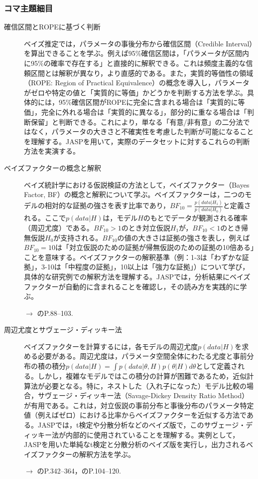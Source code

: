 \subsubsection{コマ主題細目}
\begin{description}
	\item[確信区間とROPEに基づく判断] ベイズ推定では，パラメータの事後分布から確信区間（Credible Interval）を算出できることを学ぶ。例えば95\%確信区間は，「パラメータが区間内に95\%の確率で存在する」と直接的に解釈できる。これは頻度主義的な信頼区間とは解釈が異なり，より直感的である。また，実質的等価性の領域（ROPE: Region of Practical Equivalence）の概念を導入し，パラメータがゼロや特定の値と「実質的に等価」かどうかを判断する方法を学ぶ。具体的には，95\%確信区間がROPEに完全に含まれる場合は「実質的に等価」，完全に外れる場合は「実質的に異なる」，部分的に重なる場合は「判断保留」と判断できる。これにより，単なる「有意/非有意」の二分法ではなく，パラメータの大きさと不確実性を考慮した判断が可能になることを理解する。JASPを用いて，実際のデータセットに対するこれらの判断方法を実演する。

	\item[ベイズファクターの概念と解釈] ベイズ統計学における仮説検証の方法として，ベイズファクター（Bayes Factor, BF）の概念と解釈について学ぶ。ベイズファクターは，二つのモデルの相対的な証拠の強さを表す比率であり，$BF_{10} = \frac{p(data|H_1)}{p(data|H_0)}$と定義される。ここで$p(data|H)$は，モデル$H$のもとでデータが観測される確率（周辺尤度）である。$BF_{10} > 1$のとき対立仮説$H_1$が，$BF_{10} < 1$のとき帰無仮説$H_0$が支持される。$BF_{10}$の値の大きさは証拠の強さを表し，例えば$BF_{10} = 10$は「対立仮説のための証拠が帰無仮説のための証拠の10倍ある」ことを意味する。ベイズファクターの解釈基準（例：1-3は「わずかな証拠」，3-10は「中程度の証拠」，10以上は「強力な証拠」）について学び，具体的な研究例での解釈方法を理解する。JASPでは，分析結果にベイズファクターが自動的に含まれることを確認し，その読み方を実践的に学ぶ。
	      \begin{flushright}
		      $\to$ \textcite{Lee201709}のP.88--103.
	      \end{flushright}

	\item[周辺尤度とサヴェージ・ディッキー法] ベイズファクターを計算するには，各モデルの周辺尤度$p(data|H)$を求める必要がある。周辺尤度は，パラメータ空間全体にわたる尤度と事前分布の積の積分$p(data|H) = \int p(data|\theta, H)p(\theta|H)d\theta$として定義される。しかし，複雑なモデルではこの積分の計算が困難であるため，近似計算法が必要となる。特に，ネストした（入れ子になった）モデル比較の場合，サヴェージ・ディッキー法（Savage-Dickey Density Ratio Method）が有用である。これは，対立仮説の事前分布と事後分布のパラメータ特定値（例えばゼロ）における比率からベイズファクターを近似する方法である。JASPでは，t検定や分散分析などのベイズ版で，このサヴェージ・ディッキー法が内部的に使用されていることを理解する。実例として，JASPを用いた単純なt検定と分散分析のベイズ版を実行し，出力されるベイズファクターの解釈方法を学ぶ。
	      \begin{flushright}
		      $\to$ \textcite{Maeda2017}のP.342--364，\textcite{Lee201709}のP.104--120.
	      \end{flushright}


\end{description}
